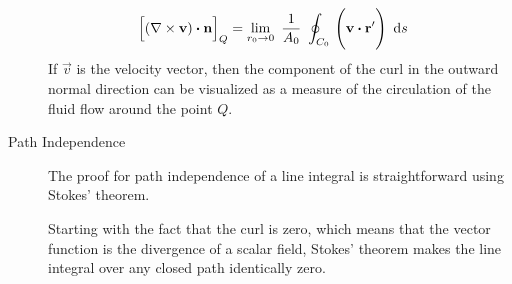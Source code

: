 \begin{description}
        \begin{align}
            \Big[(\nabla \times \vec{v}) \dotp \vec{n}\Big]_Q
             & = \lim_{r_0 \rightarrow 0}
            \ \frac{1}{A_0}\ \oint_{C_0}\ \Biggl( \vec{v} \dotp \vec{r}'
            \Biggr)\ \dl s
        \end{align}
        If $ \vec{v} $ is the velocity vector, then the component of the curl in the
        outward normal direction can be visualized as a measure of the circulation of
        the fluid flow around the point $ Q $.

    \item[Path Independence] The proof for path independence of a line integral is
        straightforward using Stokes' theorem. \par
        Starting with the fact that the curl is zero, which means that the vector 
        function is the divergence of a scalar field, Stokes' theorem makes the 
        line integral over any closed path identically zero. \par
\end{description}